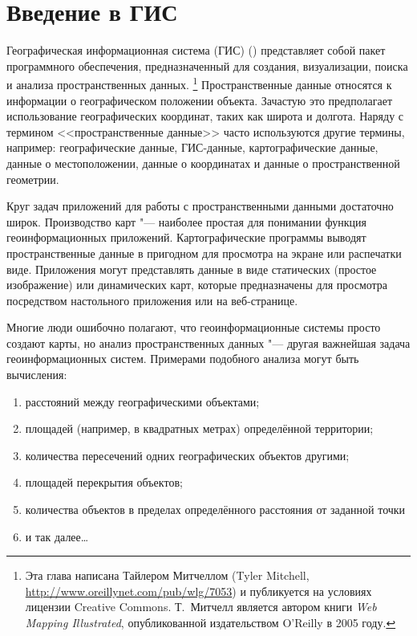 \pagestyle{scrheadings}
\chapter{Введение в ГИС}\label{label_intro}


Географическая информационная система (ГИС) (\cite{mitchel05}) представляет
собой пакет программного обеспечения, предназначенный для
создания, визуализации, поиска и анализа пространственных данных.
\footnote{Эта глава написана Тайлером Митчеллом (Tyler Mitchell,
\url{http://www.oreillynet.com/pub/wlg/7053}) и публикуется на условиях
лицензии Creative Commons. Т.~Митчелл является автором книги
\textit{Web Mapping Illustrated}, опубликованной издательством O'Reilly
в 2005 году.}
Пространственные данные относятся к информации о географическом положении
объекта. Зачастую это предполагает использование географических координат,
таких как широта и долгота. Наряду с термином <<пространственные данные>> часто
используются другие термины, например: географические данные, ГИС-данные,
картографические данные, данные о местоположении, данные о координатах
и данные о пространственной геометрии.

Круг задач приложений для работы с пространственными данными достаточно широк.
Производство карт "--- наиболее простая для понимании функция
геоинформационных приложений. Картографические программы выводят
пространственные данные в пригодном для просмотра на экране или распечатки виде.
Приложения могут представлять данные в виде статических (простое изображение) или
динамических карт, которые предназначены для просмотра посредством
настольного приложения или на веб-странице.

Многие люди ошибочно полагают, что геоинформационные системы просто
создают карты, но анализ пространственных данных "--- другая важнейшая
задача геоинформационных систем. Примерами подобного анализа
могут быть вычисления:

\begin{enumerate}
\item расстояний между географическими объектами;
\item площадей (например, в квадратных метрах) определённой территории;
\item количества пересечений одних географических объектов другими;
\item площадей перекрытия объектов;
\item количества объектов в пределах определённого расстояния от заданной точки
\item и так далее\ldots
\end{enumerate}

